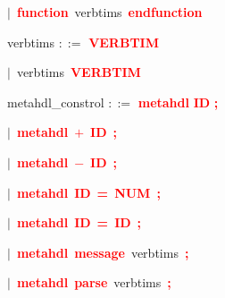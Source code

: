 \mbox{$|$ \textbf{\textcolor{red}{function}} verbtims \textbf{\textcolor{red}{endfunction}}}

\vspace{1em}
\noindent
\settowidth{\parindent}{\hspace{4ex}}
verbtims $::=$\hspace{1ex} \textbf{\textcolor{red}{VERBTIM}}

\mbox{$|$ verbtims \textbf{\textcolor{red}{VERBTIM}}}

\vspace{1em}
\noindent
\settowidth{\parindent}{\hspace{4ex}}
metahdl\_constrol $::=$\hspace{1ex} \textbf{\textcolor{red}{metahdl}} \textbf{\textcolor{red}{ID}} \textbf{\textcolor{red}{;}}

\mbox{$|$ \textbf{\textcolor{red}{metahdl}} \textbf{\textcolor{red}{$+$}} \textbf{\textcolor{red}{ID}} \textbf{\textcolor{red}{;}}}

\mbox{$|$ \textbf{\textcolor{red}{metahdl}} \textbf{\textcolor{red}{$-$}} \textbf{\textcolor{red}{ID}} \textbf{\textcolor{red}{;}}}

\mbox{$|$ \textbf{\textcolor{red}{metahdl}} \textbf{\textcolor{red}{ID}} \textbf{\textcolor{red}{=}} \textbf{\textcolor{red}{NUM}} \textbf{\textcolor{red}{;}}}

\mbox{$|$ \textbf{\textcolor{red}{metahdl}} \textbf{\textcolor{red}{ID}} \textbf{\textcolor{red}{=}} \textbf{\textcolor{red}{ID}} \textbf{\textcolor{red}{;}}}

\mbox{$|$ \textbf{\textcolor{red}{metahdl}} \textbf{\textcolor{red}{message}} verbtims \textbf{\textcolor{red}{;}}}

\mbox{$|$ \textbf{\textcolor{red}{metahdl}} \textbf{\textcolor{red}{parse}} verbtims \textbf{\textcolor{red}{;}}}
